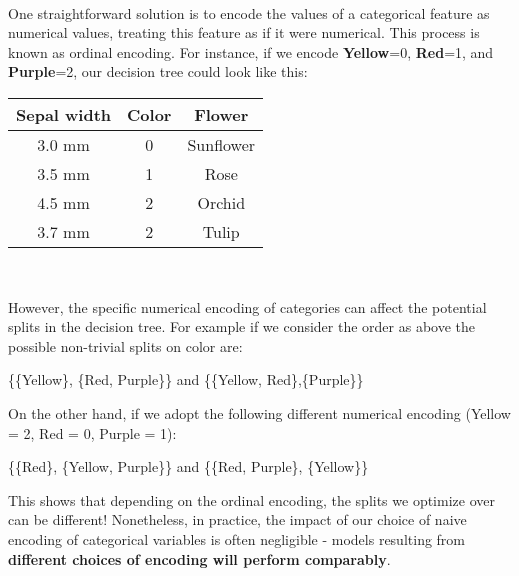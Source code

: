 \documentclass[10pt,a4paper]{report}
\begin{document}
\paragraph{}One straightforward solution is to encode the values of a categorical feature as numerical values, treating this feature as if it were numerical. This process is known as ordinal encoding. For instance, if we encode \textbf{Yellow}=0, \textbf{Red}=1, and \textbf{Purple}=2, our decision tree could look like this:\begin{center}
\begin{tabular}{ |c|c|c| } 
\hline
Sepal width&Color& Flower\\\hline\hline
3.0 mm & {\color{yellow}0}& Sunflower \\\hline
3.5 mm & {\color{red}1}& Rose \\\hline
4.5 mm & {\color{Plum}2}& Orchid\\\hline
3.7 mm & {\color{Plum}2}& Tulip\\\hline
\end{tabular}\\
\end{center}
However, the specific numerical encoding of categories can affect the potential splits in the decision tree. For example if we consider the order as above the possible non-trivial splits on color are:
\begin{center}
\{\{Yellow\}, \{Red, Purple\}\} and \{\{Yellow, Red\},\{Purple\}\}
\end{center}
On the other hand, if we adopt the following different numerical encoding (Yellow = 2, Red = 0, Purple = 1):
\begin{center}
\{\{Red\}, \{Yellow, Purple\}\} and \{\{Red, Purple\}, \{Yellow\}\}
\end{center}
This shows that depending on the ordinal encoding, the splits we optimize over can be different! Nonetheless, in practice, the impact of our choice of naive encoding of categorical variables is often negligible - models resulting from \textbf{different choices of encoding will perform comparably}.
\end{document}
